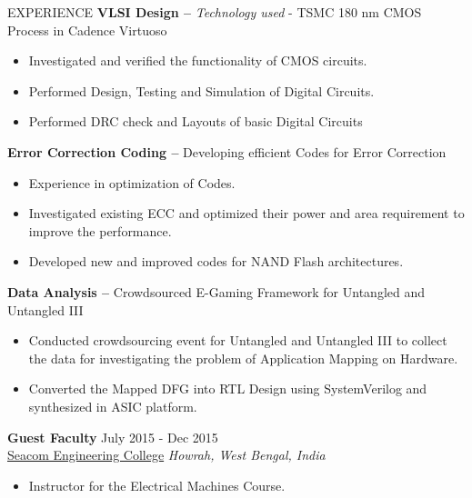 \documentclass{resume} %
\begin{document}
\begin{rSection}{EXPERIENCE}
    \textbf{VLSI Design --} \textit{Technology used} - TSMC 180 nm CMOS Process in Cadence Virtuoso
        \begin{itemize}
            \itemsep -3pt {} 
            \item Investigated and verified the functionality of CMOS circuits.
            \item Performed Design, Testing and Simulation of Digital Circuits.
            \item Performed DRC check and Layouts of basic Digital Circuits
        \end{itemize}
    
    \textbf{Error Correction Coding --} Developing efficient Codes for Error Correction
        \begin{itemize}
            \itemsep -3pt {} 
            \item Experience in optimization of Codes.
            \item Investigated existing ECC and optimized their power and area requirement to improve the performance.
            \item Developed new and improved codes for NAND Flash architectures.
        \end{itemize}
        
    \textbf{Data Analysis --} Crowdsourced E-Gaming Framework for Untangled and Untangled III
        \begin{itemize}
            \itemsep -3pt {} 
            \item Conducted crowdsourcing event for Untangled and Untangled III to collect the data for investigating the problem of Application Mapping on Hardware.
            \item Converted the Mapped DFG into RTL Design using SystemVerilog and synthesized in ASIC platform.
        \end{itemize}
     
    \textbf{Guest Faculty} \hfill July 2015 - Dec 2015\\
    \href{https://www.seacomengineering.org}{Seacom Engineering College} \hfill \textit{Howrah, West Bengal, India}
        \begin{itemize}
            \itemsep -3pt {} 
            \item Instructor for the Electrical Machines Course.
        \end{itemize}
\end{rSection}
\end{document}

